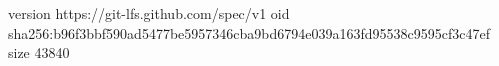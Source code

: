 version https://git-lfs.github.com/spec/v1
oid sha256:b96f3bbf590ad5477be5957346cba9bd6794e039a163fd95538c9595cf3c47ef
size 43840
